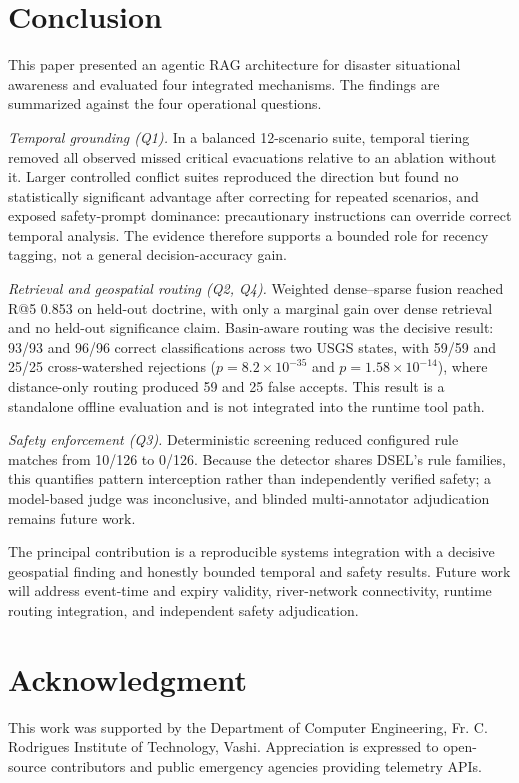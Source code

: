 \documentclass[conference]{IEEEtran}
\begin{document}
\section{Conclusion}
This paper presented an agentic RAG architecture for disaster situational awareness and evaluated four integrated mechanisms. The findings are summarized against the four operational questions.

\textit{Temporal grounding (Q1).} In a balanced 12-scenario suite, temporal tiering removed all observed missed critical evacuations relative to an ablation without it. Larger controlled conflict suites reproduced the direction but found no statistically significant advantage after correcting for repeated scenarios, and exposed safety-prompt dominance: precautionary instructions can override correct temporal analysis. The evidence therefore supports a bounded role for recency tagging, not a general decision-accuracy gain.

\textit{Retrieval and geospatial routing (Q2, Q4).} Weighted dense--sparse fusion reached R@5 0.853 on held-out doctrine, with only a marginal gain over dense retrieval and no held-out significance claim. Basin-aware routing was the decisive result: 93/93 and 96/96 correct classifications across two USGS states, with 59/59 and 25/25 cross-watershed rejections ($p=8.2\times10^{-35}$ and $p=1.58\times10^{-14}$), where distance-only routing produced 59 and 25 false accepts. This result is a standalone offline evaluation and is not integrated into the runtime tool path.

\textit{Safety enforcement (Q3).} Deterministic screening reduced configured rule matches from 10/126 to 0/126. Because the detector shares DSEL's rule families, this quantifies pattern interception rather than independently verified safety; a model-based judge was inconclusive, and blinded multi-annotator adjudication remains future work.

The principal contribution is a reproducible systems integration with a decisive geospatial finding and honestly bounded temporal and safety results. Future work will address event-time and expiry validity, river-network connectivity, runtime routing integration, and independent safety adjudication.

\section*{Acknowledgment}
This work was supported by the Department of Computer Engineering, Fr. C. Rodrigues Institute of Technology, Vashi. Appreciation is expressed to open-source contributors and public emergency agencies providing telemetry APIs.
\end{document}
